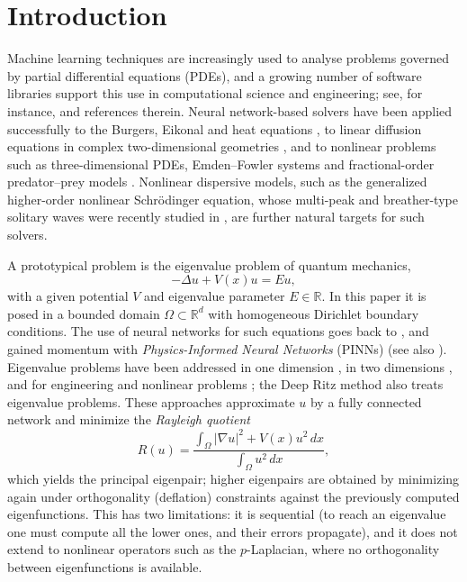 \documentclass[10pt]{amsart}
\theoremstyle{definition}
\theoremstyle{remark}
\theoremstyle{plain}
\newcommand{\R}{\mathbb{R}}
\begin{document}
\maketitle

\section{Introduction}

Machine learning techniques are increasingly used to analyse problems governed by partial
differential equations (PDEs), and a growing number of software libraries support this use in
computational science and engineering; see, for instance,
\cite{Lu-Meng-Mao, Rackauckas, Rackauckas-Innes-Ma-Bettencourt-etal} and references therein.
Neural network-based solvers have been applied successfully to the Burgers, Eikonal and heat
equations \cite{Blechschmidt-Ernst}, to linear diffusion equations in complex two-dimensional
geometries \cite{Berg-Nystrom}, and to nonlinear problems such as three-dimensional PDEs,
Emden--Fowler systems and fractional-order predator--prey models \cite{GT24, KKG, MHO}. Nonlinear
dispersive models, such as the generalized higher-order nonlinear Schr\"odinger equation, whose
multi-peak and breather-type solitary waves were recently studied in \cite{Yasin-etal}, are further
natural targets for such solvers.

A prototypical problem is the eigenvalue problem of quantum mechanics,
\begin{equation}\label{eigen}
-\Delta u + V(x) u = E u,
\end{equation}
with a given potential $V$ and eigenvalue parameter $E\in\R$. In this paper it is posed in a bounded
domain $\Omega\subset\R^d$ with homogeneous Dirichlet boundary conditions. The use of neural networks
for such equations goes back to \cite{Lagaris-Likas-Fotiadis}, and gained momentum with
\emph{Physics-Informed Neural Networks} (PINNs) \cite{Raissi-Perdiakaris-Karniadakis}
(see also \cite{Karniadakis-etal}). Eigenvalue problems have been addressed in one dimension
\cite{Jin-Mattheakis-Protopapas1, Jin-Mattheakis-Protopapas2, Sakar}, in two dimensions
\cite{Holliday-Lindner-Ditto}, and for engineering and nonlinear problems
\cite{Rowan-Evans-Maute-Dootsan}; the Deep Ritz method \cite{E-Yu} also treats eigenvalue problems.
These approaches approximate $u$ by a fully connected network and minimize the \emph{Rayleigh quotient}
\[
R(u) = \frac{\int_{\Omega} |\nabla u|^2 + V(x) u^2\, dx}{\int_{\Omega} u^2\, dx},
\]
which yields the principal eigenpair; higher eigenpairs are obtained by minimizing again under
orthogonality (deflation) constraints against the previously computed eigenfunctions. This has two
limitations: it is sequential (to reach an eigenvalue one must compute all the lower ones, and
their errors propagate), and it does not extend to nonlinear operators such as the $p$-Laplacian,
where no orthogonality between eigenfunctions is available.
\end{document}

